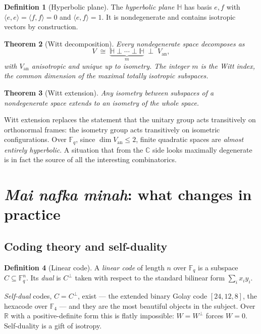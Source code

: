 \documentclass[11pt,a4paper]{article}
\newtheorem{theorem}{Theorem}[section]
\theoremstyle{definition}
\newtheorem{definition}[theorem]{Definition}
\theoremstyle{remark}
\newcommand{\FF}{\mathbb{F}}
\newcommand{\CC}{\mathbb{C}}
\newcommand{\RR}{\mathbb{R}}
\newcommand{\HH}{\mathbb{H}}
\newcommand{\ip}[2]{\langle #1, #2 \rangle}
\newcommand{\perpp}{^{\perp}}
\begin{document}
\begin{definition}[Hyperbolic plane]\label{def:hyp}
The \emph{hyperbolic plane} $\HH$ has basis $e, f$ with $\ip{e}{e} = \ip{f}{f} = 0$ and
$\ip{e}{f} = 1$. It is nondegenerate and contains isotropic vectors by construction.
\end{definition}

\begin{theorem}[Witt decomposition]
Every nondegenerate space decomposes as
\[
  V \;\cong\; \underbrace{\HH \perp \cdots \perp \HH}_{m} \;\perp\; V_{\mathrm{an}},
\]
with $V_{\mathrm{an}}$ anisotropic and unique up to isometry. The integer $m$ is the
\emph{Witt index}, the common dimension of the maximal totally isotropic subspaces.
\end{theorem}

\begin{theorem}[Witt extension]
Any isometry between subspaces of a nondegenerate space extends to an isometry of the whole
space.
\end{theorem}

Witt extension replaces the statement that the unitary group acts transitively on orthonormal
frames: the isometry group acts transitively on isometric configurations. Over $\FF_q$, since
$\dim V_{\mathrm{an}} \leq 2$, finite quadratic spaces are \emph{almost entirely hyperbolic}.
A situation that from the $\CC$ side looks maximally degenerate is in fact the source of all
the interesting combinatorics.

\section{\emph{Mai nafka minah}: what changes in practice}

\subsection{Coding theory and self-duality}

\begin{definition}[Linear code]
A \emph{linear code} of length $n$ over $\FF_q$ is a subspace $C \subseteq \FF_q^{n}$. Its
\emph{dual} is $C\perpp$ taken with respect to the standard bilinear form $\sum_i x_i y_i$.
\end{definition}

\emph{Self-dual} codes, $C = C\perpp$, exist --- the extended binary Golay code $[24,12,8]$,
the hexacode over $\FF_4$ --- and they are the most beautiful objects in the subject. Over
$\RR$ with a positive-definite form this is flatly impossible: $W = W\perpp$ forces $W = 0$.
Self-duality is a gift of isotropy.
\end{document}
